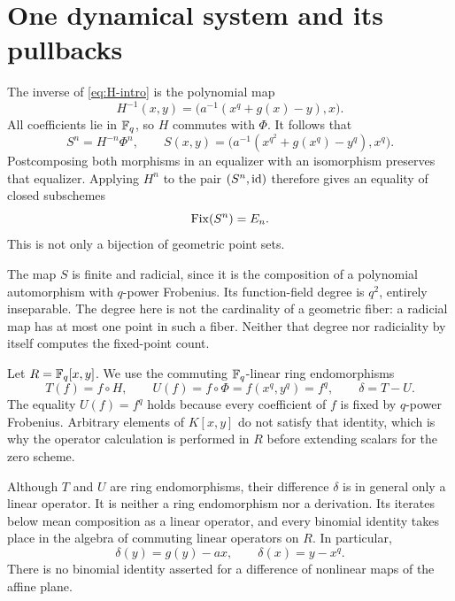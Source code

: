\section{One dynamical system and its pullbacks}\label{sec:system}

The inverse of \eqref{eq:H-intro} is the polynomial map
\begin{equation}\label{eq:inverse}
 H^{-1}(x,y)=\bigl(a^{-1}(x^q+g(x)-y),x\bigr).
\end{equation}
All coefficients lie in $\mathbb F_q$, so $H$ commutes with $\Phi$. It follows
that
\begin{equation}\label{eq:S}
 S^n=H^{-n}\Phi^n,\qquad
 S(x,y)=\bigl(a^{-1}(x^{q^2}+g(x^q)-y^q),x^q\bigr).
\end{equation}
Postcomposing both morphisms in an equalizer with an isomorphism
preserves that equalizer. Applying $H^n$ to the pair $(S^n,\operatorname{id})$
therefore gives an equality of closed subschemes
\begin{equation}\label{eq:equalizer}
 \operatorname{Fix}(S^n)=E_n.
\end{equation}
This is not only a bijection of geometric point sets.

The map $S$ is finite and radicial, since it is the composition of a
polynomial automorphism with $q$-power Frobenius. Its function-field
degree is $q^2$, entirely inseparable. The degree here is not the
cardinality of a geometric fiber: a radicial map has at most one point
in such a fiber. Neither that degree nor radiciality by itself computes
the fixed-point count.

Let $R=\mathbb F_q[x,y]$. We use the commuting $\mathbb F_q$-linear ring endomorphisms
\begin{equation}\label{eq:operators}
 T(f)=f\circ H,\qquad
 U(f)=f\circ\Phi=f(x^q,y^q)=f^q,
 \qquad \delta=T-U.
\end{equation}
The equality $U(f)=f^q$ holds because every coefficient of $f$ is fixed
by $q$-power Frobenius. Arbitrary elements of $K[x,y]$ do not satisfy
that identity, which is why the operator calculation is performed in
$R$ before extending scalars for the zero scheme.

Although $T$ and $U$ are ring endomorphisms, their difference $\delta$
is in general only a linear operator. It is neither a ring endomorphism
nor a derivation. Its iterates below mean composition as a linear
operator, and every binomial identity takes place in the algebra of
commuting linear operators on $R$. In particular,
\begin{equation}\label{eq:delta-basic}
 \delta(y)=g(y)-ax,\qquad \delta(x)=y-x^q.
\end{equation}
There is no binomial identity asserted for a difference of nonlinear
maps of the affine plane.
